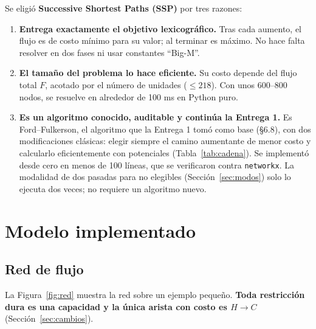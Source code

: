 \documentclass{article}
\begin{document}
Se eligió \textbf{Successive Shortest Paths (SSP)} por tres razones:
\begin{enumerate}
    \item \textbf{Entrega exactamente el objetivo lexicográfico.} Tras cada aumento, el flujo es de costo mínimo para su valor; al terminar es máximo. No hace falta resolver en dos fases ni usar constantes ``Big-M''.
    \item \textbf{El tamaño del problema lo hace eficiente.} Su costo depende del flujo total $F$, acotado por el número de unidades ($\leq 218$). Con unos 600--800 nodos, se resuelve en alrededor de 100 ms en Python puro.
    \item \textbf{Es un algoritmo conocido, auditable y continúa la Entrega 1.} Es Ford--Fulkerson, el algoritmo que la Entrega 1 tomó como base (§6.8), con dos modificaciones clásicas: elegir siempre el camino aumentante de menor costo y calcularlo eficientemente con potenciales (Tabla~\ref{tab:cadena}). Se implementó desde cero en menos de 100 líneas, que se verificaron contra \texttt{networkx}. La modalidad de dos pasadas para no elegibles (Sección~\ref{sec:modos}) solo lo ejecuta dos veces; no requiere un algoritmo nuevo.
\end{enumerate}

\section{Modelo implementado}
\label{sec:modelo}

\subsection{Red de flujo}

La Figura~\ref{fig:red} muestra la red sobre un ejemplo pequeño. \textbf{Toda restricción dura es una capacidad y la única arista con costo es $H \to C$} (Sección~\ref{sec:cambios}).
\end{document}
